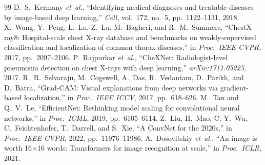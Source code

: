 \documentclass[10pt,journal,onecolumn]{IEEEtran}
\begin{document}
\begin{thebibliography}{99}
 D.~S.~Kermany \emph{et~al.}, ``Identifying medical diagnoses and treatable diseases by image-based deep learning,'' \emph{Cell}, vol.~172, no.~5, pp.~1122--1131, 2018.
 X.~Wang, Y.~Peng, L.~Lu, Z.~Lu, M.~Bagheri, and R.~M.~Summers, ``ChestX-ray8: Hospital-scale chest X-ray database and benchmarks on weakly-supervised classification and localization of common thorax diseases,'' in \emph{Proc.\ IEEE CVPR}, 2017, pp.~2097--2106.
 P.~Rajpurkar \emph{et~al.}, ``CheXNet: Radiologist-level pneumonia detection on chest X-rays with deep learning,'' \emph{arXiv:1711.05225}, 2017.
 R.~R.~Selvaraju, M.~Cogswell, A.~Das, R.~Vedantam, D.~Parikh, and D.~Batra, ``Grad-CAM: Visual explanations from deep networks via gradient-based localization,'' in \emph{Proc.\ IEEE ICCV}, 2017, pp.~618--626.
 M.~Tan and Q.~V.~Le, ``EfficientNet: Rethinking model scaling for convolutional neural networks,'' in \emph{Proc.\ ICML}, 2019, pp.~6105--6114.
 Z.~Liu, H.~Mao, C.-Y.~Wu, C.~Feichtenhofer, T.~Darrell, and S.~Xie, ``A ConvNet for the 2020s,'' in \emph{Proc.\ IEEE CVPR}, 2022, pp.~11976--11986.
 A.~Dosovitskiy \emph{et~al.}, ``An image is worth 16$\times$16 words: Transformers for image recognition at scale,'' in \emph{Proc.\ ICLR}, 2021.
\end{thebibliography}
\end{document}
